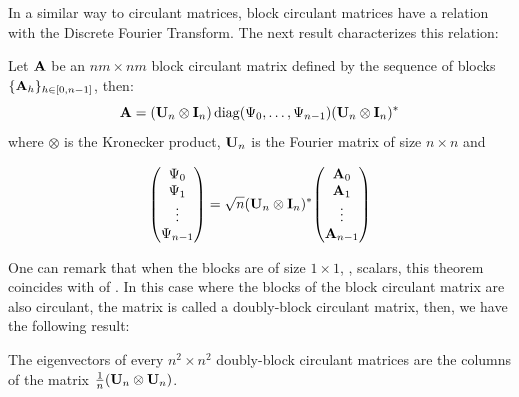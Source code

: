 In a similar way to circulant matrices, block circulant matrices have a relation with the Discrete Fourier Transform.
The next result characterizes this relation:
\begin{theorem}
  Let $\mathbf{A}$ be an $nm \times nm$ block circulant matrix defined by the sequence of blocks $\{\mathbf{A}_h\}_{h \in [0,n-1]}$, then:
  \begin{equation}
    \mathbf{A} = (\mathbf{U}_n \otimes \mathbf{I}_n) \operatorname*{diag}(\Psi_0, \dots, \Psi_{n-1}) (\mathbf{U}_n \otimes \mathbf{I}_n)^*
  \end{equation}
  where $\otimes$ is the Kronecker product, $\mathbf{U}_n$ is the Fourier matrix of size $n \times n$ and

  \begin{equation}
    \leftmatrix
      \Psi_{0} \\
      \Psi_{1} \\
      \vdots \\
      \Psi_{n-1} \\
    \rightmatrix = 
    \sqrt{n}(\Umat_n \otimes \Imat_n)^* 
    \leftmatrix
      \Amat_{0} \\
      \Amat_{1} \\
      \vdots \\
      \Amat_{n-1} \\
    \rightmatrix
  \end{equation}
  \removespace
\end{theorem}
\noindent
One can remark that when the blocks are of size $1 \times 1$, \ie, scalars, this theorem coincides with  of .
In this case where the blocks of the block circulant matrix are also circulant, the matrix is called a doubly-block circulant matrix, then, we have the following result:
\begin{theorem} \label{theorem:ch2-diaginalization_doubly_block_circulant_matrix}
  The eigenvectors of every $n^2 \times n^2$ doubly-block circulant matrices are the columns of the matrix $\frac{1}{n} \left( \Umat_n \otimes \Umat_n \right)$.
\end{theorem}



